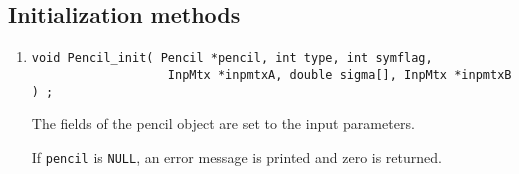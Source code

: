 \subsection{Initialization methods}
\label{subsection:Pencil:proto:initial}
\par
\begin{enumerate}
\item
\begin{verbatim}
void Pencil_init( Pencil *pencil, int type, int symflag,
                   InpMtx *inpmtxA, double sigma[], InpMtx *inpmtxB ) ;
\end{verbatim}
The fields of the pencil object are set to the input
parameters.
\par {}
If {\tt pencil} is {\tt NULL},
an error message is printed and zero is returned.
\end{enumerate}
\par
